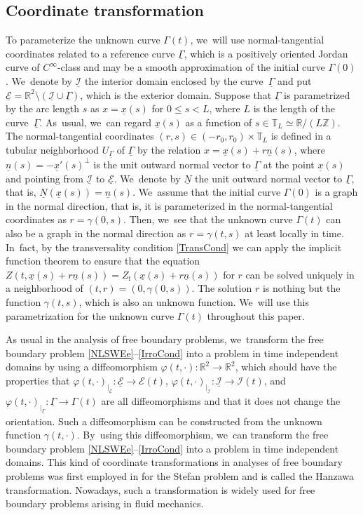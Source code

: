 \documentclass[JEP,XML,SOM,Unicode,NoFloatCountersInSection,published]{cedram}
\newcommand{\R}{{\mathbb R}}
\newcommand{\cI}{{\mathcal I}}
\newcommand{\cE}{{\mathcal E}}
\newcommand{\ul}[1]{\underline{#1}}
\newcommand{\itGamma}{\mathit{\Gamma}}
\theoremstyle{definition}
\begin{document}
\subsection{Coordinate transformation}\label{subsect:CT}
To parameterize the unknown curve $\itGamma(t)$, we~will use normal-tangential coordinates related to a reference curve $\ul{\itGamma}$,
which is a positively oriented Jordan curve of $C^\infty$-class and may be a smooth approximation of the initial curve $\itGamma(0)$. We~denote by $\ul{\cI}$ the interior domain enclosed by the curve~$\ul{\itGamma}$ and put $\ul{\cE}=\R^2\setminus(\ul{\cI}\cup\ul{\itGamma})$,
which is the exterior domain.
Suppose that $\ul{\itGamma}$ is parametrized by the arc length $s$ as $x = \ul{x}(s)$ for $0\leq s<L$, where $L$ is the length of the curve~$\ul{\itGamma}$. As~usual, we~can regard $\ul{x}(s)$ as a function of $s \in \mathbb{T}_L \simeq \R/(L\mathbb{Z})$.
The normal-tangential coordinates $(r,s)\in(-r_0,r_0)\times\mathbb{T}_L$ is defined in a tubular neighborhood $U_{\ul{\itGamma}}$ of $\ul{\itGamma}$
by the relation $x=\ul{x}(s)+r\ul{n}(s)$,
where $\ul{n}(s)=-\ul{x}'(s)^\perp$ is the unit outward normal vector to $\ul{\itGamma}$ at the point $\ul{x}(s)$ and pointing from $\ul{\cI}$ to $\ul{\cE}$. We~denote by $\ul{N}$ the unit outward normal vector to $\ul{\itGamma}$, that is, $\ul{N}(\ul{x}(s))=\ul{n}(s)$. We~assume that the initial curve $\itGamma(0)$ is a graph in the normal direction, that is,
it is parameterized in the normal-tangential coordinates as $r=\gamma(0,s)$.
Then, we~see that the unknown curve $\itGamma(t)$ can also be a graph in the normal direction as $r=\gamma(t,s)$ at least locally in time. In~fact, by the transversality condition \eqref{TransCond} we can apply the implicit function theorem to ensure that the equation
$Z(t,\ul{x}(s)+r\ul{n}(s)) = Z_\mathrm{i}(\ul{x}(s)+r\ul{n}(s))$ for $r$ can be solved uniquely in a neighborhood of $(t,r)=(0,\gamma(0,s))$.
The solution $r$ is nothing but the function $\gamma(t,s)$, which is also an unknown function. We~will use this parametrization for the unknown curve $\itGamma(t)$ throughout this paper.

As usual in the analysis of free boundary problems, we~transform the free boundary problem \eqref{NLSWEe}--\eqref{IrroCond} into a problem
in time independent domains by using a diffeomorphism $\varphi(t,\cdot):\R^2\to\R^2$, which should have the properties that
$\varphi(t,\cdot)_{\vert_{\ul{\cE}}} : \ul{\cE}\to \cE(t)$, $\varphi(t,\cdot)_{\vert_{\ul{\cI}}} : \ul{\cI}\to \cI(t)$,
and $\varphi(t,\cdot)_{\vert_{\ul{\itGamma}}} : \ul{\itGamma}\to \itGamma(t)$ are all diffeomorphisms and that it does not change the orientation.
Such a diffeomorphism can be constructed from the unknown function $\gamma(t,\cdot)$. By~using this diffeomorphism, we~can transform the free boundary problem \eqref{NLSWEe}--\eqref{IrroCond} into a problem in time independent domains.
This kind of coordinate transformations in analyses of free boundary problems was first employed in \cite{Hanzawa1981} for the Stefan problem
and is called the Hanzawa transformation.
Nowadays, such a transformation is widely used for free boundary problems arising in fluid mechanics.
\end{document}
